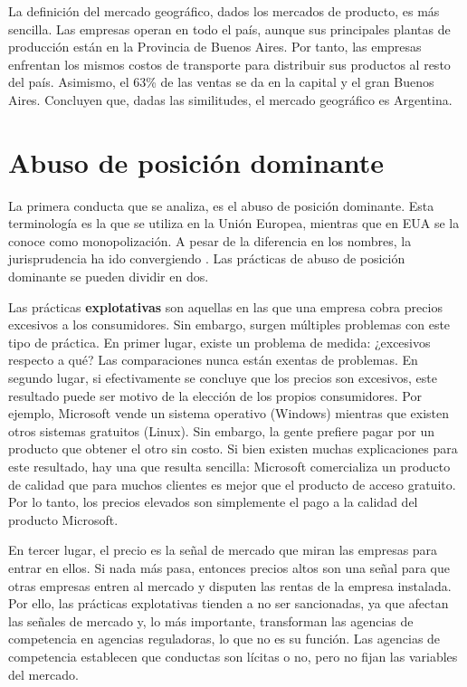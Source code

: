 \documentclass[
  12pt,
  spanish,
]{book}
\begin{document}
La definición del mercado geográfico, dados los mercados de producto, es
más sencilla. Las empresas operan en todo el país, aunque sus
principales plantas de producción están en la Provincia de Buenos Aires.
Por tanto, las empresas enfrentan los mismos costos de transporte para
distribuir sus productos al resto del país. Asimismo, el 63\% de las
ventas se da en la capital y el gran Buenos Aires. Concluyen que, dadas
las similitudes, el mercado geográfico es Argentina.

\hypertarget{abuso-de-posiciuxf3n-dominante}{%
\section{Abuso de posición
dominante}\label{abuso-de-posiciuxf3n-dominante}}

La primera conducta que se analiza, es el abuso de posición dominante.
Esta terminología es la que se utiliza en la Unión Europea, mientras que
en EUA se la conoce como monopolización. A pesar de la diferencia en los
nombres, la jurisprudencia ha ido convergiendo \citep[sección
1.2]{Motta2004}. Las prácticas de abuso de posición dominante se pueden
dividir en dos.

Las prácticas \textbf{explotativas} son aquellas en las que una empresa
cobra precios excesivos a los consumidores. Sin embargo, surgen
múltiples problemas con este tipo de práctica. En primer lugar, existe
un problema de medida: ¿excesivos respecto a qué? Las comparaciones
nunca están exentas de problemas. En segundo lugar, si efectivamente se
concluye que los precios son excesivos, este resultado puede ser motivo
de la elección de los propios consumidores. Por ejemplo, Microsoft vende
un sistema operativo (Windows) mientras que existen otros sistemas
gratuitos (Linux). Sin embargo, la gente prefiere pagar por un producto
que obtener el otro sin costo. Si bien existen muchas explicaciones para
este resultado, hay una que resulta sencilla: Microsoft comercializa un
producto de calidad que para muchos clientes es mejor que el producto de
acceso gratuito. Por lo tanto, los precios elevados son simplemente el
pago a la calidad del producto Microsoft.

En tercer lugar, el precio es la señal de mercado que miran las empresas
para entrar en ellos. Si nada más pasa, entonces precios altos son una
señal para que otras empresas entren al mercado y disputen las rentas de
la empresa instalada. Por ello, las prácticas explotativas tienden a no
ser sancionadas, ya que afectan las señales de mercado y, lo más
importante, transforman las agencias de competencia en agencias
reguladoras, lo que no es su función. Las agencias de competencia
establecen que conductas son lícitas o no, pero no fijan las variables
del mercado.
\end{document}
